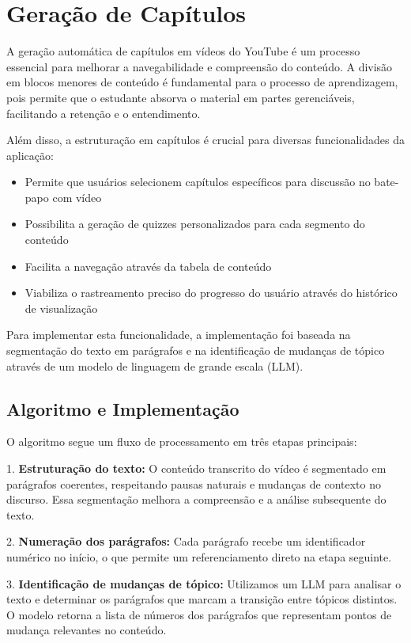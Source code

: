 \documentclass[tcc,capa]{texufpel}
\begin{document}
\section{Geração de Capítulos}

A geração automática de capítulos em vídeos do YouTube é um processo essencial para melhorar a navegabilidade e compreensão do conteúdo. A divisão em blocos menores de conteúdo é fundamental para o processo de aprendizagem, pois permite que o estudante absorva o material em partes gerenciáveis, facilitando a retenção e o entendimento.

Além disso, a estruturação em capítulos é crucial para diversas funcionalidades da aplicação:

\begin{itemize}
    \item Permite que usuários selecionem capítulos específicos para discussão no bate-papo com vídeo
    \item Possibilita a geração de quizzes personalizados para cada segmento do conteúdo
    \item Facilita a navegação através da tabela de conteúdo
    \item Viabiliza o rastreamento preciso do progresso do usuário através do histórico de visualização
\end{itemize}

Para implementar esta funcionalidade, a implementação foi baseada na segmentação do texto em parágrafos e na identificação de mudanças de tópico através de um modelo de linguagem de grande escala (LLM).

\subsection{Algoritmo e Implementa\c{c}\~{a}o}

O algoritmo segue um fluxo de processamento em tr\^{e}s etapas principais:

1. \textbf{Estrutura\c{c}\~{a}o do texto:} O conte\'udo transcrito do v\'{i}deo \'{e} segmentado em par\'{a}grafos coerentes, respeitando pausas naturais e mudan\c{c}as de contexto no discurso. Essa segmenta\c{c}\~{a}o melhora a compreens\~{a}o e a an\'{a}lise subsequente do texto.

2. \textbf{Numera\c{c}\~{a}o dos par\'{a}grafos:} Cada par\'{a}grafo recebe um identificador num\'erico no in\'{i}cio, o que permite um referenciamento direto na etapa seguinte.

3. \textbf{Identifica\c{c}\~{a}o de mudan\c{c}as de t\'opico:} Utilizamos um LLM para analisar o texto e determinar os par\'{a}grafos que marcam a transi\c{c}\~{a}o entre t\'opicos distintos. O modelo retorna a lista de n\'{u}meros dos par\'{a}grafos que representam pontos de mudan\c{c}a relevantes no conte\'udo.
\end{document}
